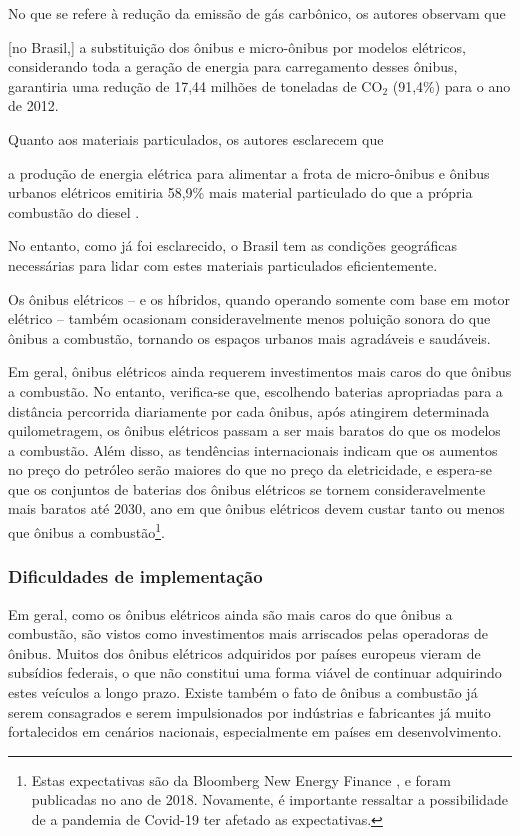 No que se refere à redução da emissão de gás carbônico, os autores observam que

\begin{displayquote}
    \textelp{} [no Brasil,] a substituição dos ônibus e micro-ônibus por modelos elétricos, considerando toda a geração de energia para carregamento desses ônibus, garantiria uma redução de 17,44 milhões de toneladas de CO$_2$ (91,4\%) para o ano de 2012.
\end{displayquote}

Quanto aos materiais particulados, os autores esclarecem que

\begin{displayquote}
    a produção de energia elétrica para alimentar a frota de micro-ônibus e ônibus urbanos elétricos emitiria 58,9\% mais material particulado do que a própria combustão do diesel \cite{LIMA:19}.
\end{displayquote}

No entanto, como já foi esclarecido, o Brasil tem as condições geográficas necessárias para lidar com estes materiais particulados eficientemente.

Os ônibus elétricos -- e os híbridos, quando operando somente com base em motor elétrico -- também ocasionam consideravelmente menos poluição sonora do que ônibus a combustão, tornando os espaços urbanos mais agradáveis e saudáveis.

Em geral, ônibus elétricos ainda requerem investimentos mais caros do que ônibus a combustão. No entanto, verifica-se que, escolhendo baterias apropriadas para a distância percorrida diariamente por cada ônibus, após atingirem determinada quilometragem, os ônibus elétricos passam a ser mais baratos do que os modelos a combustão. Além disso, as tendências internacionais indicam que os aumentos no preço do petróleo serão maiores do que no preço da eletricidade, e espera-se que os conjuntos de baterias dos ônibus elétricos se tornem consideravelmente mais baratos até 2030, ano em que ônibus elétricos devem custar tanto ou menos que ônibus a combustão\footnote{Estas expectativas são da Bloomberg New Energy Finance \cite{BLOOMBERG:18}, e foram publicadas no ano de 2018. Novamente, é importante ressaltar a possibilidade de a pandemia de Covid-19 ter afetado as expectativas.}.

\subsubsection*{Dificuldades de implementação}\label{sec:dificuldades de implementação}
Em geral, como os ônibus elétricos ainda são mais caros do que ônibus a combustão, são vistos como investimentos mais arriscados pelas operadoras de ônibus. Muitos dos ônibus elétricos adquiridos por países europeus vieram de subsídios federais, o que não constitui uma forma viável de continuar adquirindo estes veículos a longo prazo. Existe também o fato de ônibus a combustão já serem consagrados e serem impulsionados por indústrias e fabricantes já muito fortalecidos em cenários nacionais, especialmente em países em desenvolvimento.

